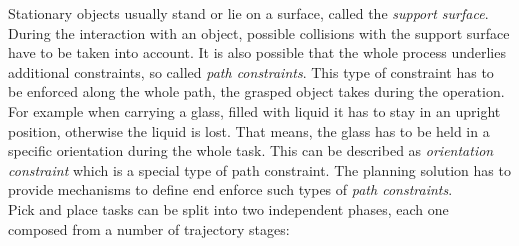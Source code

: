 Stationary objects usually stand or lie on a surface, called the \emph{support surface}. During the interaction with an object, possible collisions with the support surface have to be taken into account. It is also possible that the whole process underlies additional constraints, so called \emph{path constraints}. This type of constraint has to be enforced along the whole path, the grasped object takes during the operation. For example when carrying a glass, filled with liquid it has to stay in an upright position, otherwise the liquid is lost. That means, the glass has to be held in a specific orientation during the whole task. This can be described as \emph{orientation constraint} which is a special type of path constraint. The planning solution has to provide mechanisms to define end enforce such types of \emph{path constraints}. \\

Pick and place tasks can be split into two independent phases, each one composed from a number of trajectory stages:

